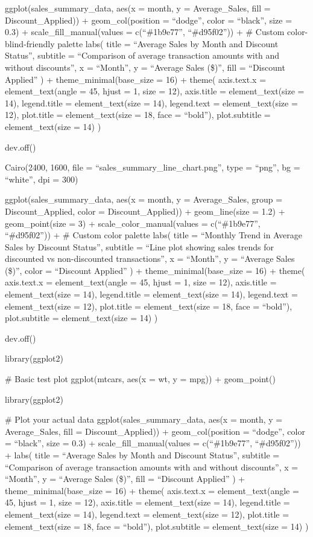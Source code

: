 \documentclass[
]{article}
\begin{document}
ggplot(sales\_summary\_data, aes(x = month, y = Average\_Sales, fill =
Discount\_Applied)) + geom\_col(position = ``dodge'', color = ``black'',
size = 0.3) + scale\_fill\_manual(values = c(``\#1b9e77'',
``\#d95f02'')) + \# Custom color-blind-friendly palette labs( title =
``Average Sales by Month and Discount Status'', subtitle = ``Comparison
of average transaction amounts with and without discounts'', x =
``Month'', y = ``Average Sales (\$)'', fill = ``Discount Applied'' ) +
theme\_minimal(base\_size = 16) + theme( axis.text.x =
element\_text(angle = 45, hjust = 1, size = 12), axis.title =
element\_text(size = 14), legend.title = element\_text(size = 14),
legend.text = element\_text(size = 12), plot.title = element\_text(size
= 18, face = ``bold''), plot.subtitle = element\_text(size = 14) )

dev.off()

Cairo(2400, 1600, file = ``sales\_summary\_line\_chart.png'', type =
``png'', bg = ``white'', dpi = 300)

ggplot(sales\_summary\_data, aes(x = month, y = Average\_Sales, group =
Discount\_Applied, color = Discount\_Applied)) + geom\_line(size = 1.2)
+ geom\_point(size = 3) + scale\_color\_manual(values = c(``\#1b9e77'',
``\#d95f02'')) + \# Custom color palette labs( title = ``Monthly Trend
in Average Sales by Discount Status'', subtitle = ``Line plot showing
sales trends for discounted vs non-discounted transactions'', x =
``Month'', y = ``Average Sales (\$)'', color = ``Discount Applied'' ) +
theme\_minimal(base\_size = 16) + theme( axis.text.x =
element\_text(angle = 45, hjust = 1, size = 12), axis.title =
element\_text(size = 14), legend.title = element\_text(size = 14),
legend.text = element\_text(size = 12), plot.title = element\_text(size
= 18, face = ``bold''), plot.subtitle = element\_text(size = 14) )

dev.off()

library(ggplot2)

\# Basic test plot ggplot(mtcars, aes(x = wt, y = mpg)) + geom\_point()

library(ggplot2)

\# Plot your actual data ggplot(sales\_summary\_data, aes(x = month, y =
Average\_Sales, fill = Discount\_Applied)) + geom\_col(position =
``dodge'', color = ``black'', size = 0.3) + scale\_fill\_manual(values =
c(``\#1b9e77'', ``\#d95f02'')) + labs( title = ``Average Sales by Month
and Discount Status'', subtitle = ``Comparison of average transaction
amounts with and without discounts'', x = ``Month'', y = ``Average Sales
(\$)'', fill = ``Discount Applied'' ) + theme\_minimal(base\_size = 16)
+ theme( axis.text.x = element\_text(angle = 45, hjust = 1, size = 12),
axis.title = element\_text(size = 14), legend.title = element\_text(size
= 14), legend.text = element\_text(size = 12), plot.title =
element\_text(size = 18, face = ``bold''), plot.subtitle =
element\_text(size = 14) )
\end{document}
